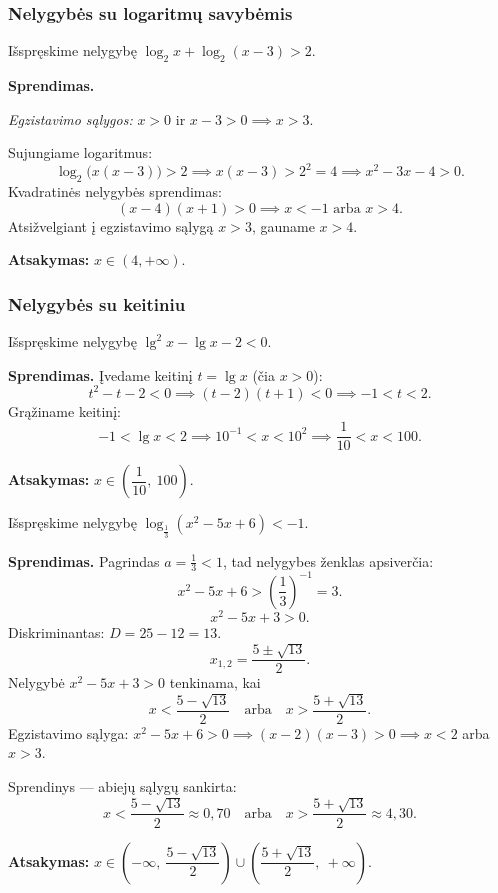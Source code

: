 \subsubsection*{Nelygybės su logaritmų savybėmis}

\begin{example}
Išspręskime nelygybę $\log_2 x + \log_2(x - 3) > 2$.

\textbf{Sprendimas.}

\textit{Egzistavimo sąlygos:} $x > 0$ ir $x - 3 > 0 \implies x > 3$.

Sujungiame logaritmus:
\[
\log_2\bigl(x(x-3)\bigr) > 2 \implies x(x-3) > 2^2 = 4 \implies x^2 - 3x - 4 > 0.
\]
Kvadratinės nelygybės sprendimas:
\[
(x - 4)(x + 1) > 0 \implies x < -1 \text{ arba } x > 4.
\]
Atsižvelgiant į egzistavimo sąlygą $x > 3$, gauname $x > 4$.

\textbf{Atsakymas:} $x \in (4, +\infty)$.
\end{example}

\subsubsection*{Nelygybės su keitiniu}

\begin{example}
Išspręskime nelygybę $\lg^2 x - \lg x - 2 < 0$.

\textbf{Sprendimas.} Įvedame keitinį $t = \lg x$ (čia $x > 0$):
\[
t^2 - t - 2 < 0 \implies (t - 2)(t + 1) < 0 \implies -1 < t < 2.
\]
Grąžiname keitinį:
\[
-1 < \lg x < 2 \implies 10^{-1} < x < 10^2 \implies \frac{1}{10} < x < 100.
\]

\textbf{Atsakymas:} $x \in \left(\dfrac{1}{10},\ 100\right)$.
\end{example}

\begin{example}
Išspręskime nelygybę $\log_{\frac{1}{3}}(x^2 - 5x + 6) < -1$.

\textbf{Sprendimas.} Pagrindas $a = \tfrac{1}{3} < 1$, tad nelygybes ženklas apsiverčia:
\[
x^2 - 5x + 6 > \left(\frac{1}{3}\right)^{-1} = 3.
\]
\[
x^2 - 5x + 3 > 0.
\]
Diskriminantas: $D = 25 - 12 = 13$.
\[
x_{1,2} = \frac{5 \pm \sqrt{13}}{2}.
\]
Nelygybė $x^2 - 5x + 3 > 0$ tenkinama, kai
\[
x < \frac{5 - \sqrt{13}}{2} \quad \text{arba} \quad x > \frac{5 + \sqrt{13}}{2}.
\]
Egzistavimo sąlyga: $x^2 - 5x + 6 > 0 \implies (x-2)(x-3) > 0 \implies x < 2$ arba $x > 3$.

Sprendinys — abiejų sąlygų sankirta:
\[
x < \frac{5 - \sqrt{13}}{2} \approx 0{,}70 \quad \text{arba} \quad x > \frac{5 + \sqrt{13}}{2} \approx 4{,}30.
\]

\textbf{Atsakymas:} $x \in \left(-\infty,\ \dfrac{5-\sqrt{13}}{2}\right) \cup \left(\dfrac{5+\sqrt{13}}{2},\ +\infty\right)$.
\end{example}

